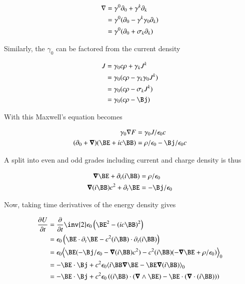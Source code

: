 \begin{align*}
\nabla &= \gamma^0 \partial_0 + \gamma^k \partial_k \\
&= \gamma^0 (\partial_0 - \gamma^k \gamma_0 \partial_k) \\
&= \gamma^0 (\partial_0 + \sigma_k \partial_k) \\
\end{align*}

Similarly, the $\gamma_0$ can be factored from the current density

\begin{align*}
J 
&= \gamma_0 c \rho + \gamma_k J^k \\
&= \gamma_0 (c \rho - \gamma_k \gamma_0 J^k) \\
&= \gamma_0 (c \rho - \sigma_k J^k) \\
&= \gamma_0 (c \rho - \Bj )
\end{align*}

With this Maxwell's equation becomes
 
\begin{align*}
\gamma_0 \grad F &= \gamma_0 J / \epsilon_0 c \\
(\partial_0 + \spacegrad) ( \BE + i c \BB ) &= \rho/\epsilon_0 - \Bj/\epsilon_0 c \\
\end{align*}
 
A split into even and odd grades including current and charge density is thus
 
\begin{align*}
\spacegrad \BE + \partial_t (i \BB) &= \rho/\epsilon_0 \\
\spacegrad (i \BB) c^2 + \partial_t \BE &= -\Bj/\epsilon_0
\end{align*}
 
Now, taking time derivatives of the energy density gives

\begin{align*}
\PD{t}{U} 
&= \PD{t}{}\inv{2} \epsilon_0 \left( \BE^2 - (ic \BB)^2 \right) \\
&= \epsilon_0 \left( \BE \cdot \partial_t \BE - c^2 (i\BB) \cdot \partial_t (i\BB) \right) \\
&= \epsilon_0 \gpgradezero{ \BE ( -\Bj/\epsilon_0 -\spacegrad (i \BB) c^2 ) - c^2 (i\BB) ( -\spacegrad \BE + \rho/\epsilon_0 ) } \\
&= -\BE \cdot \Bj + c^2 \epsilon_0 \gpgradezero{ i\BB \spacegrad \BE -\BE \spacegrad (i \BB) } \\
&= -\BE \cdot \Bj + c^2 \epsilon_0 \left( (i\BB) \cdot (\spacegrad \wedge \BE) - \BE \cdot (\spacegrad \cdot (i \BB)) \right) \\
\end{align*}

